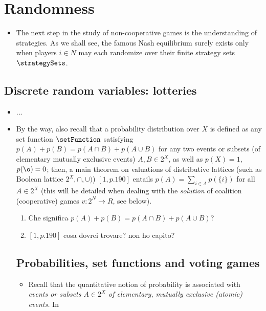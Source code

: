 \chapter{Randomness}
\begin{itemize}
 \item The next step in the study of non-cooperative games is the understanding of strategies. As we shall see, the famous Nash equilibrium surely exists only when players $i \in N$ may each randomize over their finite strategy sets $\strategySets$.
\end{itemize}

\section{Discrete random variables: lotteries}
\begin{itemize}
 \item ...
 \item By the way, also recall that a probability distribution over $X$ is defined as any set function $\setFunction$ satisfying $p(A)+p(B)=p(A \cap B)+p(A \cup B)$ for any two events or subsets (of elementary mutually exclusive events) $A, B \in 2^X$, as well as $p(X)=1$, $p(\o)=0$; then, a main theorem on valuations of distributive lattices (such as Boolean lattice $2^X, \cap, \cup)$) $[1, p. 190]$ entails $p(A) = \sum_{i \in A}p(\{i\})$ for all $A \in 2^X$ (this will be detailed when dealing with the \emph{solution} of coalition (cooperative) games $v:2^N \to R$, see below).
     \begin{enumerate}
      \item Che significa $p(A)+p(B)=p(A \cap B)+p(A \cup B)$?
      \item $[1, p. 190]$ cosa dovrei trovare? non ho capito?
     \end{enumerate}

\section{Probabilities, set functions and voting games}
	\begin{itemize}
		\item Recall that the quantitative notion of probability is associated with \emph{events or subsets $A \in 2^X$ of elementary, mutually exclusive (atomic) events.} In 
	\end{itemize}

\end{itemize}